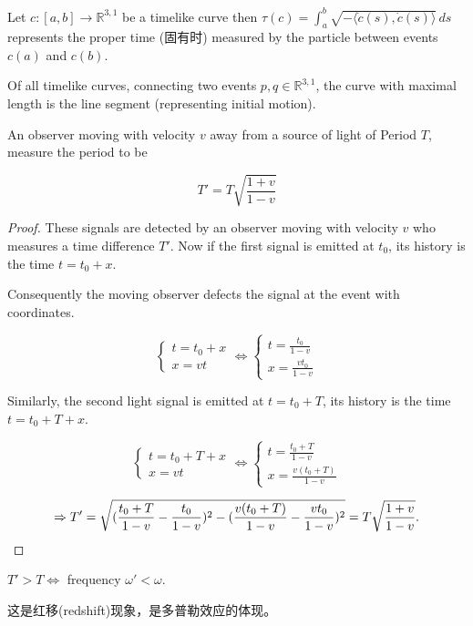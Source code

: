 Let \( c:[a,b] \rightarrow \mathbb{R}^{3,1} \) be a timelike curve  
then \( \tau(c) = \int_{a}^{b} \sqrt{-\langle\dot{c}(s),\dot{c}(s)\rangle} \, ds \)  
represents the proper time (固有时)
measured by the particle between events \( c(a) \) and \( c(b) \).  

\begin{prop} 
Of all timelike curves,  
connecting two events \( p,q \in \mathbb{R}^{3,1} \), the curve with maximal length is the line segment (representing initial motion).  
\end{prop}

\begin{prop}
An observer moving with velocity \( v \) away from a source of light of Period $T$, 
measure the period to be  

\[T'=T\sqrt{\frac{1+v}{1-v}}\]


\end{prop}
 \begin{proof}
These signals are detected by an observer moving with velocity \( v \) who measures a time difference \( T' \). Now if the first signal is emitted at \( t_0 \), its history is the time \( t=t_0+x \).

Consequently the moving observer defects the signal at the event with coordinates.

\[\begin{cases} 
t=t_0+x \\ 
x=vt 
\end{cases}
\iff
\begin{cases} 
t=\frac{t_0}{1-v} \\ 
x=\frac{vt_0}{1-v} 
\end{cases}\]

Similarly, the second light signal is emitted at \( t=t_0+T \), its history is the time \( t=t_0+T+x \).

\[\begin{cases} 
t=t_0+T+x \\ 
x=vt 
\end{cases}
\iff
\begin{cases} 
t=\frac{t_0+T}{1-v} \\ 
x=\frac{v(t_0+T)}{1-v} 
\end{cases}\]

\[\Rightarrow T' = \sqrt{(\frac{t_0+T}{1-v}-\frac{t_0}{1-v})^2 - (\frac{v(t_0+T)}{1-v}-\frac{vt_0}{1-v})^2}=T\sqrt{\frac{1+v}{1-v}}.\qedhere\]
\end{proof}
\begin{remark}
    $T'>T\Leftrightarrow$ frequency $\omega'<\omega$.

    这是红移(redshift)现象，是多普勒效应的体现。
\end{remark}




